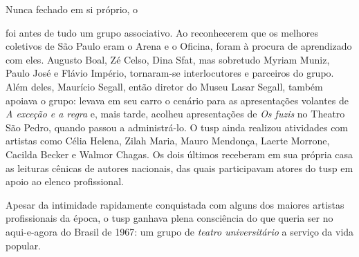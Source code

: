 
Nunca fechado em si próprio, o

\column

 foi antes de tudo um grupo
associativo. Ao reconhecerem que os melhores coletivos de São Paulo eram
o Arena e o Oficina, foram à procura de aprendizado com eles. Augusto
Boal, Zé Celso, Dina Sfat, mas sobretudo Myriam Muniz, Paulo José e
Flávio Império, tornaram-se interlocutores e parceiros do grupo. Além
deles, Maurício Segall, então diretor do Museu Lasar Segall, também
apoiava o grupo: levava em seu carro o cenário para as apresentações
volantes de {\it A exceção e a regra} e, mais tarde, acolheu
apresentações de {\it Os fuzis} no Theatro São Pedro, quando passou a
administrá-lo. O {\sc tusp} ainda realizou atividades com artistas como Célia
Helena, Zilah Maria, Mauro Mendonça, Laerte Morrone, Cacilda Becker e
Walmor Chagas. Os dois últimos receberam em sua própria casa as leituras
cênicas de autores nacionais, das quais participavam atores do {\sc tusp} em
apoio ao elenco profissional.

Apesar da intimidade rapidamente conquistada com alguns dos maiores
artistas profissionais da época, o {\sc tusp} ganhava plena consciência do que
queria ser no aqui-e-agora do Brasil de 1967: um grupo de {\it teatro
universitário} a serviço da vida popular.


\subject{Definição de uma estratégia estético-política}



